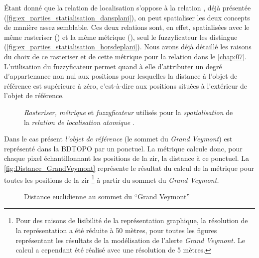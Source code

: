 Étant donné que la relation de localisation
 s'oppose à la relation
, déjà présentée
(\autoref{fig:ex_parties_statialisation_dansplani}), on peut
spatialiser les deux concepts de manière assez semblable. Ces deux
relations sont, en effet, spatialisées avec le même rasteriser
() et la même métrique (),
seul le fuzzyficateur les distingue
(\autoref{fig:ex_parties_statialisation_horsdeplani}). Nous avons déjà
détaillé les raisons du choix de ce rasteriser et de cette métrique
pour la relation  dans le
\autoref{chap:07}. L'utilisation du fuzzyficateur 
permet quand à elle d'attributer un degré d'appartenance non nul aux
positions pour lesquelles la distance à l'objet de référence est
supérieure à zéro, c'est-à-dire aux positions situées à l'extérieur de
l'objet de référence.

\begin{figure}
  \centering
  
  \caption{\emph{Rasteriser,} \emph{métrique} et \emph{fuzzyficateur}
    utilisés pour la \emph{spatialisation} de la \emph{relation de
      localisation atomique}
    \protect{}.}
  \label{fig:ex_parties_statialisation_horsdeplani}
\end{figure}

Dans le cas présent \emph{l'objet de référence} (le sommet du
\emph{Grand Veymont}) est représenté dans la BDTOPO par un
ponctuel. La métrique  calcule donc, pour chaque
pixel échantillonnant les positions de la \ac{zir}, la distance à ce
ponctuel. La \autoref{fig:Distance_GrandVeymont} représente le
résultat du calcul de la métrique  pour toutes
les positions de la \ac{zir} \footnote{Pour des raisons de lisibilité
  de la représentation graphique, la résolution de la représentation a
  été réduite à 50 mètres, pour toutes les figures représentant les
  résultats de la modélisation de l'alerte \emph{Grand Veymont.} Le
  calcul a cependant été réalisé avec une résolution de 5 mètres.} à
partir du sommet du \emph{Grand Veymont.}

\begin{figure}
  \centering
  
  \caption{Distance euclidienne au sommet du \enquote{Grand Veymont}}
  \label{fig:Distance_GrandVeymont}
\end{figure}

